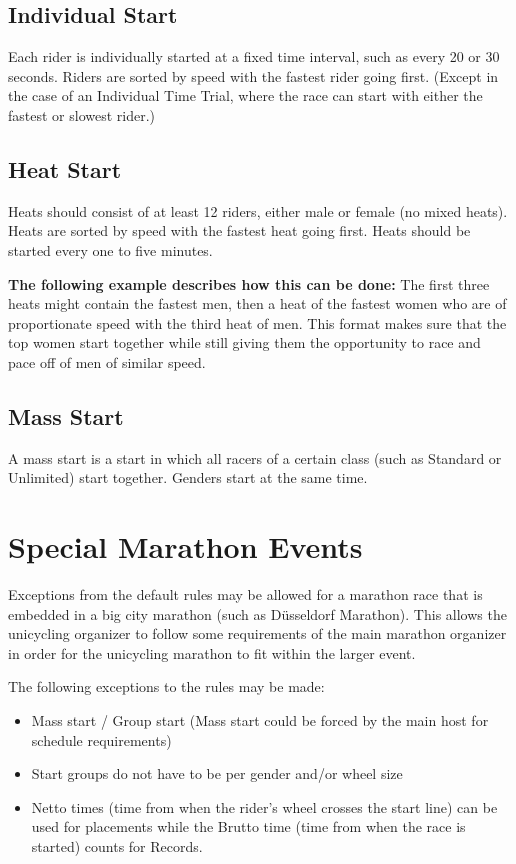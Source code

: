 \subsection{Individual Start \label{subsec:road_heat-assignment_individual-start}}
Each rider is individually started at a fixed time interval, such as every 20 or 30 seconds.
Riders are sorted by speed with the fastest rider going first.
(Except in the case of an Individual Time Trial, where the race can start with either the fastest or slowest rider.)

\subsection{Heat Start \label{subsec:road_heat-assignment_heat-start}}
Heats should consist of at least 12 riders, either male or female (no mixed heats).
Heats are sorted by speed with the fastest heat going first.
Heats should be started every one to five minutes.

\textbf{The following example describes how this can be done:}
The first three heats might contain the fastest men, then a heat of the fastest women who are of proportionate speed with the third heat of men.
This format makes sure that the top women start together while still giving them the opportunity to race and pace off of men of similar speed.

\subsection{Mass Start \label{subsec:road_heat-assignment_mass-start}}
A mass start is a start in which all racers of a certain class (such as Standard or Unlimited) start together.
Genders start at the same time.

\section{Special Marathon Events}
Exceptions from the default rules may be allowed for a marathon race that is embedded in a big city marathon (such as Düsseldorf Marathon).
This allows the unicycling organizer to follow some requirements of the main marathon organizer in order for the unicycling marathon to fit within the larger event.

The following exceptions to the rules may be made:
\begin{itemize}
\item Mass start / Group start (Mass start could be forced by the main host for schedule requirements) 
\item Start groups do not have to be per gender and/or wheel size
\item Netto times (time from when the rider's wheel crosses the start line) can be used for placements while the Brutto time (time from when the race is started) counts for Records.
\end{itemize}

